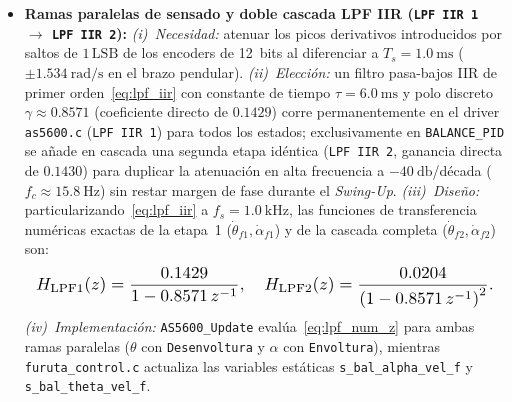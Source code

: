 \begin{itemize}
    \item \textbf{Ramas paralelas de sensado y doble cascada LPF IIR (\texttt{LPF IIR 1} $\to$ \texttt{LPF IIR 2}):}
    \textit{(i)~Necesidad:} atenuar los picos derivativos introducidos por saltos de $1\,\mathrm{LSB}$ de los encoders de 12~bits al diferenciar a $T_s=\qty{1.0}{\milli\second}$ ($\pm\qty{1.534}{\radian\per\second}$ en el brazo pendular).
    \textit{(ii)~Elección:} un filtro pasa-bajos IIR de primer orden~\eqref{eq:lpf_iir} con constante de tiempo $\tau=\qty{6.0}{\milli\second}$ y polo discreto $\gamma\approx 0.8571$ (coeficiente directo de $0.1429$) corre permanentemente en el driver \texttt{as5600.c} (\texttt{LPF IIR 1}) para todos los estados; exclusivamente en \texttt{BALANCE\_PID} se añade en cascada una segunda etapa idéntica (\texttt{LPF IIR 2}, ganancia directa de $0.1430$) para duplicar la atenuación en alta frecuencia a $\qty{-40}{\decibel}$/década ($f_c\approx\qty{15.8}{\hertz}$) sin restar margen de fase durante el \textit{Swing-Up}.
    \textit{(iii)~Diseño:} particularizando~\eqref{eq:lpf_iir} a $f_s=\qty{1.0}{\kilo\hertz}$, las funciones de transferencia numéricas exactas de la etapa~1 ($\dot{\theta}_{f1}, \dot{\alpha}_{f1}$) y de la cascada completa ($\dot{\theta}_{f2}, \dot{\alpha}_{f2}$) son:
    \begin{equation}
    \resizebox{0.95\linewidth}{!}{$\displaystyle
        H_{\text{LPF1}}(z) = \frac{0.1429}{1 - 0.8571\,z^{-1}}, \quad
        H_{\text{LPF2}}(z) = \frac{0.0204}{\left(1 - 0.8571\,z^{-1}\right)^2}.
    $}
        \label{eq:lpf_num_z}
    \end{equation}
    \textit{(iv)~Implementación:} \texttt{AS5600\_Update} evalúa~\eqref{eq:lpf_num_z} para ambas ramas paralelas ($\theta$ con \texttt{Desenvoltura} y $\alpha$ con \texttt{Envoltura}), mientras \texttt{furuta\_control.c} actualiza las variables estáticas \texttt{s\_bal\_alpha\_vel\_f} y \texttt{s\_bal\_theta\_vel\_f}.


\end{itemize}
